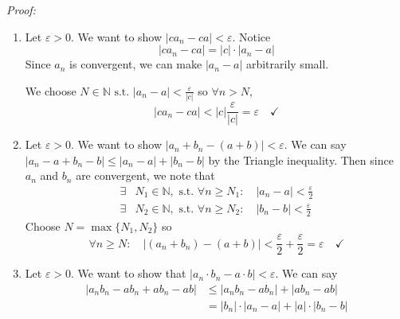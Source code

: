 \documentclass[12pt]{report}
\newcommand{\R}{\mathbb{R}}
\newcommand{\N}{\mathbb{N}}
\newcommand{\abs}[1]{\left\vert #1 \right\vert}
\newcommand{\st}{\text{ s.t. }}
\newenvironment*{tbox}[2][gray]{
    \begin{tcolorbox}[
        parbox=false,
        colback=#1!5!white,
        colframe=#1!75!black,
        breakable,
        title={#2}
    ]}
    {\end{tcolorbox}}
\begin{document}
        \begin{tbox}{\textbf{Theorem (Algebraic Limit Theorems):} Let $\lim a_n = a$, $\lim b_n = b$
            \begin{enumerate}
                \item $\lim (ca_n) = ca, \quad \forall c \in \R$
                \item $\lim (a_n + b_n) = a + b$
                \item $\lim (a_n \cdot b_n) = a \cdot b$
                \item $\lim \frac{a_n}{b_n} = \frac{a}{b}$, provided $b \neq 0$
            \end{enumerate}}

            \emph{Proof:} 
            \begin{enumerate}
                \item Let $\varepsilon > 0$. We want to show $\abs{ca_n - ca} < \varepsilon$. Notice 
                \[\abs{ca_n - ca} = \abs{c} \cdot \abs{a_n - a}\]
                Since $a_n$ is convergent, we can make $\abs{a_n - a}$ arbitrarily small.

                We choose $N \in \N \st \abs{a_n - a} < \frac{\varepsilon}{\abs{c}}$ so $\forall n > N$, 
                \[\abs{ca_n - ca} < \abs{c} \frac{\varepsilon}{\abs{c}} = \varepsilon \quad \checkmark\]

                \item Let $\varepsilon > 0$. We want to show $\abs{a_n + b_n - (a + b)} < \varepsilon$. We can say $\abs{a_n - a + b_n - b} \leq \abs{a_n - a} + \abs{b_n - b}$ by the Triangle inequality. Then since $a_n$ and $b_n$ are convergent, we note that 
                \begin{align*}
                    \exists &N_1 \in \N, \st \forall n \geq N_1: \quad \abs{a_n - a} < \frac{\varepsilon}{2}\\ 
                    \exists &N_2 \in \N, \st \forall n \geq N_2: \quad \abs{b_n - b} < \frac{\varepsilon}{2}
                \end{align*} 
                Choose $N = \max\{N_1, N_2\}$ so 
                \[\forall n \geq N: \quad \abs{(a_n + b_n) - (a + b)} < \frac{\varepsilon}{2} + \frac{\varepsilon}{2} = \varepsilon \quad \checkmark\]
                
                \item Let $\varepsilon > 0$. We want to show that $\abs{a_n \cdot b_n - a \cdot b} < \varepsilon$. We can say
                \begin{align*}
                    \abs{a_nb_n - ab_n + ab_n - ab} &\leq \abs{a_nb_n - ab_n} + \abs{ab_n - ab}\\ 
                        &= \abs{b_n} \cdot \abs{a_n - a} + \abs{a} \cdot \abs{b_n - b}
                \end{align*}


\end{enumerate}
\end{tbox}
\end{document}
